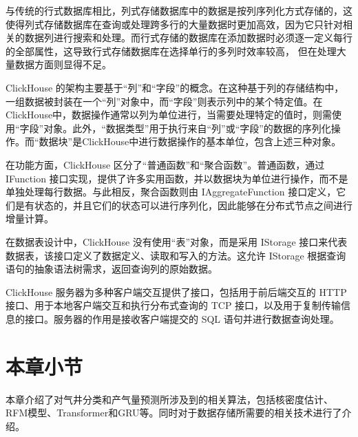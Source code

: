 与传统的行式数据库相比，列式存储数据库中的数据是按列序列化方式存储的，这使得列式存储数据库在查询或处理跨多行的大量数据时更加高效\cite{dwivedi2012performance}，因为它只针对相关的数据列进行搜索和处理。而行式存储的数据库在添加数据时必须逐一定义每行的全部属性，这导致行式存储数据库在选择单行的多列时效率较高，
但在处理大量数据方面则显得不足。

ClickHouse 的架构主要基于“列”和“字段”的概念。在这种基于列的存储结构中，一组数据被封装在一个“列”对象中，而“字段”则表示列中的某个特定值。在ClickHouse中，数据操作通常以列为单位进行，当需要处理特定的值时，则需使用“字段”对象。此外，“数据类型”用于执行来自“列”或“字段”的数据的序列化操作。而“数据块”是ClickHouse中进行数据操作的基本单位，包含上述三种对象。

在功能方面，ClickHouse 区分了“普通函数”和“聚合函数”。普通函数，通过 IFunction 接口实现，提供了许多实用函数，并以数据块为单位进行操作，而不是单独处理每行数据。与此相反，聚合函数则由 IAggregateFunction 接口定义，它们是有状态的，并且它们的状态可以进行序列化，因此能够在分布式节点之间进行增量计算。

在数据表设计中，ClickHouse 没有使用“表”对象，而是采用 IStorage 接口来代表数据表，该接口定义了数据定义、读取和写入的方法。这允许 IStorage 根据查询语句的抽象语法树需求，返回查询列的原始数据。

ClickHouse 服务器为多种客户端交互提供了接口，包括用于前后端交互的 HTTP 接口、用于本地客户端交互和执行分布式查询的 TCP 接口，以及用于复制传输信息的接口。服务器的作用是接收客户端提交的 SQL 语句并进行数据查询处理。
\section{本章小节}
本章介绍了对气井分类和产气量预测所涉及到的相关算法，包括核密度估计、RFM模型、Transformer和GRU等。同时对于数据存储所需要的相关技术进行了介绍。